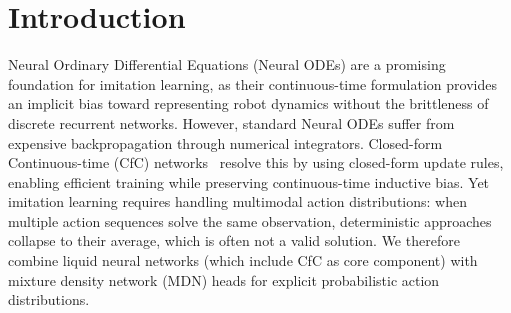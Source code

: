 \documentclass{article}
\author{
Nikolaus Correll\\
University of Colorado Boulder\\
\csname texttt\endcsname{ncorrell@colorado.edu}
}
\begin{document}
\maketitle

\begin{abstract}
We compare liquid neural networks with mixture density heads against diffusion policies on Push-T, RoboMimic Can, and PointMaze under a shared-backbone comparison protocol that isolates policy-head effects under matched inputs, training budgets, and evaluation settings. Across tasks, liquid policies use roughly half the parameters ($\sim$4.3M vs.\ $\sim$8.6M), achieve $2.4\times$ lower offline prediction error, and run $1.8\times$ faster at inference. In sample-efficiency experiments spanning 1\% to 46.42\% of training data, liquid models remain consistently more robust, with especially large gains in low-data and medium-data regimes. Closed-loop validation is consistent with the offline ranking for Push-T and PointMaze, which improve task-completion metrics. RoboMimic Can reveals a structural offline-to-online deployment gap: both policies achieve 0\% task success in closed-loop MuJoCo rollouts (mean final dense reward $1.33 \times 10^{-3}$ vs.\ $2.58 \times 10^{-5}$), while expert replay reaches 80\% success confirming simulator correctness. Despite 0\% binary success, liquid still achieves $6.6\times$ lower action-tracking error than diffusion ($0.3257$ vs.\ $2.1633$ mean per-episode $\ell_2$). Overall, liquid recurrent multimodal policies provide a compact and practical alternative to iterative denoising for imitation learning.
\end{abstract}

\section{Introduction}
Neural Ordinary Differential Equations (Neural ODEs) are a promising foundation for imitation learning, as their continuous-time formulation provides an implicit bias toward representing robot dynamics without the brittleness of discrete recurrent networks. However, standard Neural ODEs suffer from expensive backpropagation through numerical integrators. Closed-form Continuous-time (CfC) networks~\cite{hasani2022cfc} resolve this by using closed-form update rules, enabling efficient training while preserving continuous-time inductive bias. Yet imitation learning requires handling multimodal action distributions: when multiple action sequences solve the same observation, deterministic approaches collapse to their average, which is often not a valid solution. We therefore combine liquid neural networks (which include CfC as core component) with mixture density network (MDN) heads for explicit probabilistic action distributions.
\end{document}
